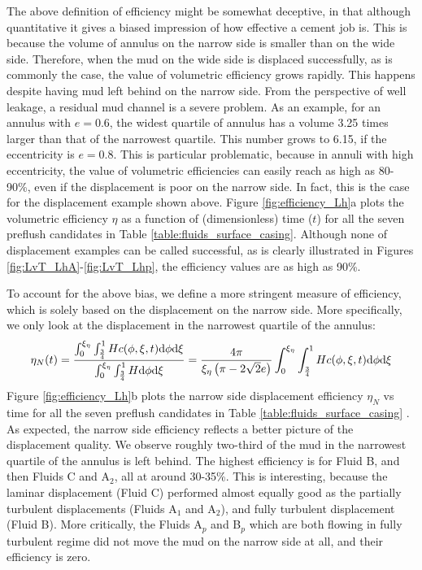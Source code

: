 \documentclass[review]{elsarticle}
\def\dd{{\rm d}} %
\begin{document}
The above definition of efficiency might be somewhat deceptive, in that although quantitative it gives a biased impression of how effective a cement job is. This is because the volume of annulus on the narrow side is smaller than on the wide side. Therefore, when the mud on the wide side is displaced successfully, as is commonly the case, the value of volumetric efficiency grows rapidly. This  happens despite having mud left behind on the narrow side. From the perspective of well leakage, a residual mud channel is a severe problem. As an example, for an annulus with $e=0.6$, the widest quartile of annulus has a volume 3.25 times larger than that of the narrowest quartile. This number grows to 6.15, if the eccentricity is $e=0.8$. This is particular problematic, because in annuli with high eccentricity, the value of volumetric efficiencies can easily reach as high as 80-90\%, even if the displacement is poor on the narrow side. In fact, this is the case for the displacement example shown above. Figure \ref{fig:efficiency_Lh}a plots the volumetric efficiency $\eta$ as a function of (dimensionless) time ($t$) for all the seven preflush candidates in Table \ref{table:fluids_surface_casing}. Although none of displacement examples can be called successful, as is clearly illustrated in Figures \ref{fig:LvT_LhA}-\ref{fig:LvT_Lhp}, the efficiency values are as high as 90\%.

To account for the above bias, we define a more stringent measure of efficiency, which is solely based on the displacement on the narrow side. More specifically, we only look at the displacement in the narrowest quartile of the annulus:
\begin{equation}\label{eq:efficiencyN1}
\eta_N(t) = \frac{\int_0^{\xi_\eta}\int_{\frac{3}{4}}^1 H c(\phi, \xi, t) \dd \phi \dd \xi}{\int_0^{\xi_\eta}\int_{\frac{3}{4}}^1 H \dd \phi \dd \xi}= \frac{4\pi}{\xi_\eta\left(\pi - 2\sqrt{2} e\right)} \int_0^{\xi_\eta}\int_{\frac{3}{4}}^1 H c(\phi, \xi, t) \dd \phi \dd \xi
\end{equation}
Figure \ref{fig:efficiency_Lh}b plots the narrow side displacement efficiency $\eta_N$ vs time for all the seven preflush candidates in Table \ref{table:fluids_surface_casing} . As expected, the narrow side efficiency reflects a better picture of the displacement quality. We observe roughly two-third of the mud in the narrowest quartile of the annulus is left behind. The highest efficiency is for Fluid B, and then Fluids C and A$_2$, all at around 30-35\%. This is interesting, because the laminar displacement (Fluid C) performed almost equally good as the partially turbulent displacements (Fluids A$_1$ and A$_2$), and fully turbulent displacement (Fluid B). More critically, the Fluids A$_p$ and B$_p$ which are both flowing in fully turbulent regime did not move the mud on the narrow side at all, and their efficiency is zero.
\end{document}
